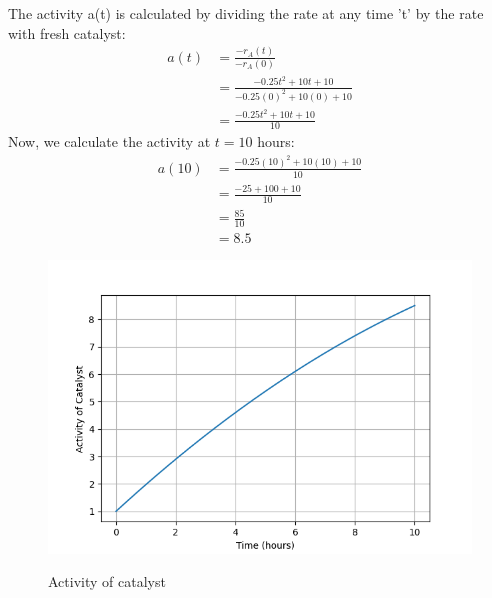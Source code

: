 \documentclass[journal,12pt,twocolumn]{IEEEtran}
\theoremstyle{remark}
\begin{document}
The activity a(t) is calculated by dividing the rate at any time 't' by the rate with fresh catalyst:\\
\begin{align}
 a(t) &= \frac{-r_A(t)}{-r_A(0)} \\
  &= \frac{-0.25t^2 + 10t + 10}{-0.25(0)^2 + 10(0) + 10}\\ 
  &= \frac{-0.25t^2 + 10t + 10}{10} 
\end{align}
Now, we calculate the activity at $t = 10$ hours:\\
\begin{align}
a(10) &= \frac{-0.25(10)^2 + 10(10) + 10}{10} \\
 &= \frac{-25 + 100 + 10}{10} \\
 &= \frac{85}{10} \\
 &= 8.5
\end{align}
\begin{figure}[h!]
\centering
\includegraphics[width=\columnwidth]{figs/gate_plot.png}
\label{fig:plot}
\caption{Activity of catalyst}
\end{figure}
\end{document}
